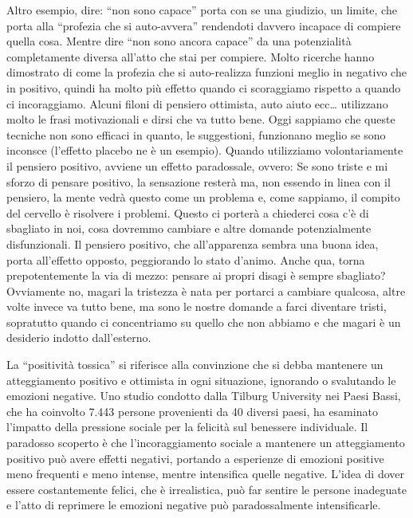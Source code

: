 \documentclass[12pt]{book} %
\begin{document}
Altro esempio, dire: “non sono capace” porta con se una giudizio, un limite, che porta alla “profezia che si
auto-avvera” rendendoti davvero incapace di compiere quella cosa. Mentre dire “non sono ancora capace” da una
potenzialità completamente diversa all'atto che stai per compiere. Molto ricerche hanno dimostrato di come la profezia
che si auto-realizza funzioni meglio in negativo che in positivo, quindi ha molto più effetto quando ci scoraggiamo
rispetto a quando ci incoraggiamo. Alcuni filoni di pensiero ottimista, auto aiuto ecc… utilizzano molto le frasi
motivazionali e dirsi che va tutto bene. Oggi sappiamo che queste tecniche non sono efficaci in quanto, le suggestioni,
funzionano meglio se sono inconsce (l'effetto placebo ne è un esempio). Quando utilizziamo
volontariamente il pensiero positivo, avviene un effetto paradossale, ovvero: Se sono triste e mi sforzo di pensare
positivo, la sensazione resterà ma, non essendo in linea con il pensiero, la mente vedrà questo come un problema e,
come sappiamo, il compito del cervello è risolvere i problemi. Questo ci porterà a chiederci cosa
c'è di sbagliato in noi, cosa dovremmo cambiare e altre domande potenzialmente disfunzionali. Il
pensiero positivo, che all'apparenza sembra una buona idea, porta all'effetto
opposto, peggiorando lo stato d'animo. Anche qua, torna prepotentemente la via di mezzo: pensare
ai propri disagi è sempre sbagliato? Ovviamente no, magari la tristezza è nata per portarci a cambiare qualcosa, altre
volte invece va tutto bene, ma sono le nostre domande a farci diventare tristi, sopratutto quando ci concentriamo su
quello che non abbiamo e che magari è un desiderio indotto dall'esterno.

La “positività tossica” si riferisce alla convinzione che si debba mantenere un atteggiamento positivo e ottimista in ogni situazione, ignorando o svalutando le emozioni negative. Uno studio condotto dalla Tilburg University nei Paesi Bassi, che ha coinvolto 7.443 persone provenienti da 40 diversi paesi, ha esaminato l’impatto della pressione sociale per la felicità sul benessere individuale.
Il paradosso scoperto è che l’incoraggiamento sociale a mantenere un atteggiamento positivo può avere effetti negativi, portando a esperienze di emozioni positive meno frequenti e meno intense, mentre intensifica quelle negative. L’idea di dover essere costantemente felici, che è irrealistica, può far sentire le persone inadeguate e l’atto di reprimere le emozioni negative può paradossalmente intensificarle.
\end{document}
